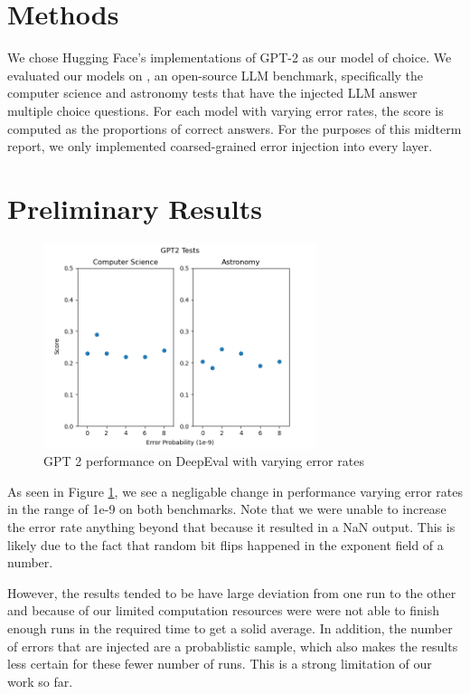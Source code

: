\documentclass[a4paper]{article}
\begin{document}
\section{Methods}

We chose Hugging Face's implementations of GPT-2 \cite{gpt2} as our model of choice. We evaluated our models on \cite{DeepEval}, an open-source LLM benchmark, specifically the computer science and astronomy tests that have the injected LLM answer multiple choice questions. For each model with varying error rates, the score is computed as the proportions of correct answers. For the purposes of this midterm report, we only implemented coarsed-grained error injection into every layer.


\section{Preliminary Results}
\begin{figure}[ht]
	\begin{center}
		\includegraphics[height=6cm]{gpt2.png}
		\caption{GPT 2 performance on DeepEval with varying error rates}
		\label{gpt2-res}
	\end{center}
\end{figure}

As seen in Figure \ref{gpt2-res}, we see a negligable change in performance varying error rates in the range of 1e-9 on both benchmarks. Note that we were unable to increase the error rate anything beyond that because it resulted in a NaN output. This is likely due to the fact that random bit flips happened in the exponent field of a number.

However, the results tended to be have large deviation from one run to the other and because of our limited computation resources were were not able to finish enough runs in the required time to get a solid average. In addition, the number of errors that are injected are a probablistic sample, which also makes the results less certain for these fewer number of runs. This is a strong limitation of our work so far.
\end{document}
